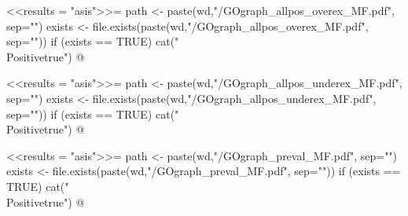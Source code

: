 \documentclass{article}
\begin{document}
\newif\ifPositive

<<results = "asis">>=
path <- paste(wd,"/GOgraph_allpos_overex_MF.pdf", sep="")
exists <- file.exists(paste(wd,"/GOgraph_allpos_overex_MF.pdf", sep=""))
if (exists == TRUE) {
  cat("\\Positivetrue")
}
@

\ifPositive
 \subsection{GOgraph showing overexpressed functions from all possible DEGs}
  This is the GO graph concerning the overexpressed DEGs from the all possible DEGs (Image extracted from {\bf"GOgraph\_allpos\_overex\_MF.pdf"} file):
  \begin{center}
    \texttt{[image: \\Sexpr\{path]}}
  \end{center}
\fi


\newif\ifPositive

<<results = "asis">>=
path <- paste(wd,"/GOgraph_allpos_underex_MF.pdf", sep="")
exists <- file.exists(paste(wd,"/GOgraph_allpos_underex_MF.pdf", sep=""))
if (exists == TRUE) {
  cat("\\Positivetrue")
}
@

\ifPositive
 \subsection{GOgraph showing ONLY underexpressed functions from all possible DEGs}
  This is the GO graph concerning the underexpressed DEGs from the all possible DEGs (Image extracted from {\bf"GOgraph\_allpos\_underex\_MF.pdf"} file):
  \begin{center}
    \texttt{[image: \\Sexpr\{path]}}
  \end{center}
\fi


\newif\ifPositive

<<results = "asis">>=
path <- paste(wd,"/GOgraph_preval_MF.pdf", sep="")
exists <- file.exists(paste(wd,"/GOgraph_preval_MF.pdf", sep=""))
if (exists == TRUE) {
  cat("\\Positivetrue")
}
@

\ifPositive
 \section{GO graphs of prevalent DEGs: Molecular Functions (MF)}
  \subsection{General GOgraph from prevalent DEGs}
  This is the GO graph concerning the prevalent DEGs (Image extracted from {\bf"GOgraph\_preval\_MF.pdf"} file):
  \begin{center}
    \texttt{[image: \\Sexpr\{path]}}
  \end{center}
\fi
\end{document}
